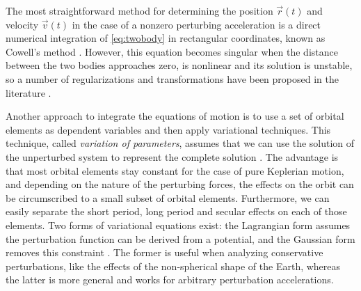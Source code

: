 The most straightforward method for determining the position $\vec{r}(t)$ and velocity $\vec{v}(t)$ in the case of a nonzero perturbing acceleration is a direct numerical integration of \ref{eq:twobody} in rectangular coordinates, known as Cowell's method \cite{battin1999introduction}. However, this equation becomes singular when the distance between the two bodies approaches zero, is nonlinear and its solution is unstable, so a number of regularizations and transformations have been proposed in the literature \cite{bau2013new}.
% 
% 
%
%
% 
% 
% 
% 
% 
% 

Another approach to integrate the equations of motion is to use a set of orbital elements as dependent variables and then apply variational techniques. This technique, called \textit{variation of parameters}, assumes that we can use the solution of the unperturbed system to represent the complete solution \cite{vallado2001fundamentals}. The advantage is that most orbital elements stay constant for the case of pure Keplerian motion, and depending on the nature of the perturbing forces, the effects on the orbit can be circumscribed to a small subset of orbital elements. Furthermore, we can easily separate the short period, long period and secular effects on each of those elements. Two forms of variational equations exist: the Lagrangian form assumes the perturbation function can be derived from a potential, and the Gaussian form removes this constraint \cite{battin1999introduction}. The former is useful when analyzing conservative perturbations, like the effects of the non-spherical shape of the Earth, whereas the latter is more general and works for arbitrary perturbation accelerations.
% 
% 
% 
% 

